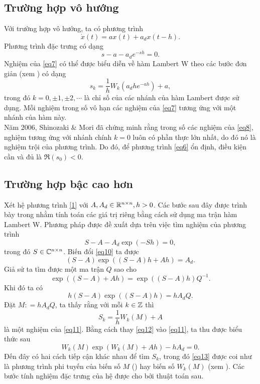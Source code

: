 \subsection{Trường hợp vô hướng}
Với trường hợp vô hướng, ta có phương trình
\begin{equation}\label{eq6}
	\dot{x}(t)=ax(t) + a_dx(t -h).
\end{equation}
Phương trình đặc trưng có dạng
\begin{equation}\label{eq7}
	s - a - a_d e ^{-s h} = 0.
\end{equation}
Nghiệm của \eqref{eq7} có thể được biểu diễn về hàm Lambert W theo các bước đơn giản (xem \cite{Yi10}) có dạng 
\begin{equation}\label{eq8}
	s_k = \dfrac{1}{h}W_k(a_d h e^{-ah})+a,
\end{equation}
trong đó $k = 0, \pm 1, \pm2, \cdots$ là chỉ số của các nhánh của hàm Lambert được sử dụng. Mỗi nghiệm trong số vô hạn các nghiệm của \eqref{eq7} tương ứng với một nhánh của hàm này.\\
Năm 2006, Shinozaki \& Mori đã chứng minh rằng trong số các nghiệm của \eqref{eq8}, nghiệm tương ứng với nhánh chính $k =0$ luôn có phần thực lớn nhất, do đó nó là nghiệm trội của phương trình. Do đó, để phương trình \eqref{eq6} ổn định, điều kiện cần và đủ  là $\Re(s_{0}) < 0$.

\subsection{Trường hợp bậc cao hơn}
Xét hệ phương trình \eqref{1} với $A, A_d \in \mathbb{R}^{n\times n}, h > 0$. Các bước sau đây được trình bày trong \cite{Yi10} nhằm tính toán các giá trị riêng bằng cách sử dụng ma trận hàm Lambert W. Phương pháp được đề xuất dựa trên việc tìm nghiệm của phương trình
\begin{equation}\label{eq10}
	S-A-A_d \exp (-Sh)=0,
\end{equation}
trong đó $S \in \mathbb{C}^{n\times n}$. Biến đổi \eqref{eq10} ta được
\begin{equation*}
	(S - A) \exp \left( (S - A) h + A h \right) = A_d.
\end{equation*}
Giả sử ta tìm được một ma trận $Q$ sao cho
\begin{equation*}
	\exp \left((S-A) + Ah \right) = \exp \left( (S-A) h \right)Q^{-1}.	
\end{equation*}
Khi đó ta có
\begin{equation}\label{eq11}
	h (S -A)\exp((S-A)h)= h A_d Q.
\end{equation}
Đặt $M : = h A_dQ$, ta thấy rằng với mỗi $k \in \mathbb{Z}$ thì
\begin{equation}\label{eq12}
	S_k = \dfrac{1}{h}W_k(M) + A 
\end{equation}
là một nghiệm của \eqref{eq11}. Bằng cách thay \eqref{eq12} vào \eqref{eq11}, ta thu được biểu thức sau
\begin{equation}\label{eq13}
	W_k(M)\exp (W_k(M)+Ah)-h A_d=0.
\end{equation}
%
Đến đây có hai cách tiếp cận khác nhau để tìm $S_k$, trong đó \eqref{eq13} được coi như là phương trình phi tuyến của biến số $M$ (\cite{Yi10}) hay biến số $W_k(M)$ (xem \cite{Wim15,GiU19}). Các bước tính nghiệm đặc trưng của hệ được cho bởi thuật toán sau. 

